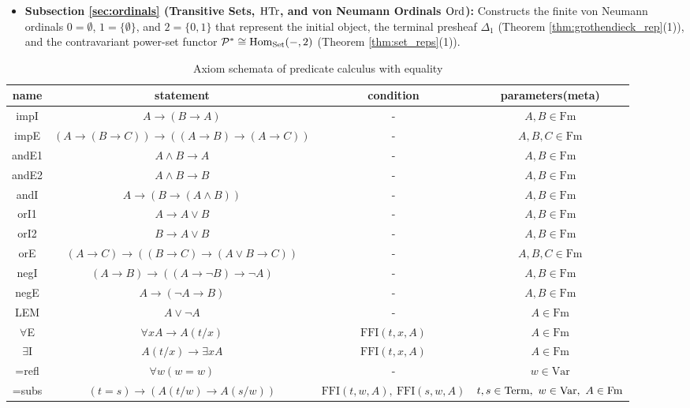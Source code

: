 \documentclass[10pt,a4paper]{article}
\begin{document}
\begin{itemize}
\item \textbf{Subsection \ref{sec:ordinals} (Transitive Sets, ${\textrm{HTr}}$, and von Neumann Ordinals ${\textrm{Ord}}$):} Constructs the finite von Neumann ordinals $0 = \emptyset$, $1 = \{\emptyset\}$, and $2 = \{0, 1\}$ that represent the initial object, the terminal presheaf $\Delta_1$ (Theorem \ref{thm:grothendieck_rep}(1)), and the contravariant power-set functor ${\mathcal{P}}^* \cong {\textrm{Hom}}_{\textrm{Set}}(-, 2)$ (Theorem \ref{thm:set_reps}(1)).
\end{itemize}

\begin{table}[H]
\centering
{\small
\setlength{\tabcolsep}{3.5pt}
\caption{Axiom schemata of predicate calculus with equality}
\label{tab:axiompltab}
\begin{tabular}{|c|c|c|c|}
\hline
name & statement & condition & parameters(meta)\\ \hline
\hline
impI & $A \to (B \to A)$ & - & $A,B \in \textrm{Fm}$\\ %
impE & $(A \to (B \to C))\to((A\to B)\to(A\to C))$ & -& $A,B,C \in \textrm{Fm}$\\ \hline
\hline
andE1 & $A \land B \to A$& -& $A,B \in \textrm{Fm}$\\ %
andE2 & $A \land B \to B$& -& $A,B \in \textrm{Fm}$\\ %
andI & $A\to(B\to (A \land B))$& -& $A,B \in \textrm{Fm}$\\ \hline
\hline
orI1 & $A \to  A \lor B$& -& $A,B \in \textrm{Fm}$\\ %
orI2 & $B \to  A \lor B$& -& $A,B \in \textrm{Fm}$\\ %
orE & $(A \to  C)\to ((B \to  C) \to  (A \lor B \to  C))$& -& $A,B,C \in \textrm{Fm}$\\ \hline
\hline
negI & $(A \to  B) \to  ((A \to  \neg B) \to  \neg A)$& -& $A,B \in \textrm{Fm}$\\ %
negE & $A \to  (\neg A \to  B)$& -& $A,B \in \textrm{Fm}$\\ \hline
\hline
LEM & $A \lor \neg A$& -& $A \in \textrm{Fm}$\\ \hline
\hline
$\forall$E & $\forall xA\to A(t/x)$ & $\textrm{FFI}(t,x,A)$& $A \in \textrm{Fm}$\\ %
$\exists$I & $A(t/x)\to \exists x A$ & $\textrm{FFI}(t,x,A)$& $A \in \textrm{Fm}$\\ \hline
\hline
=refl&$\forall w (w=w)$&-& $w \in \textrm{Var}$\\
=subs&$(t=s)\to ( A(t/w)\to A(s/w)) $&$\textrm{FFI}(t,w,A),\ \textrm{FFI}(s,w,A)$& $t,s \in {\textrm{Term}},\ w \in {\textrm{Var}},\ A \in {\textrm{Fm}}$\\\hline
\end{tabular}}
\end{table}
\end{document}
